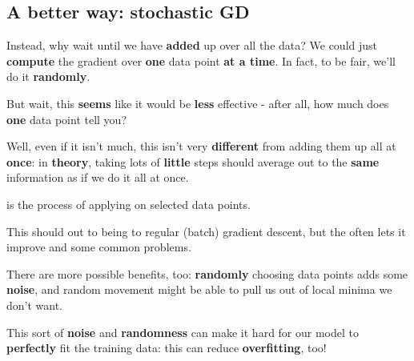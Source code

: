     \subsection{A better way: stochastic GD}
        
        Instead, why wait until we have \textbf{added} up over all the data? We could just \textbf{compute} the gradient over \textbf{one} data point \textbf{at a time}. In fact, to be fair, we'll do it \textbf{randomly}. 
        
        But wait, this \textbf{seems} like it would be \textbf{less} effective - after all, how much does \textbf{one} data point tell you? 
        
        Well, even if it isn't much, this isn't very \textbf{different} from adding them up all at \textbf{once}: in \textbf{theory}, taking lots of \textbf{little} steps should average out to the \textbf{same} information as if we do it all at once.\\
        
        \begin{definition}
             is the process of applying  on  selected data points.
            
            This should  out to being  to regular (batch) gradient descent, but the  often lets it improve  and  some common problems.
        \end{definition}
            
        
        There are more possible benefits, too: \textbf{randomly} choosing data points adds some \textbf{noise}, and random movement might be able to pull us out of local minima we don't want.
            
        This sort of \textbf{noise} and \textbf{randomness} can make it hard for our model to \textbf{perfectly} fit the training data: this can reduce \textbf{overfitting}, too!
            
